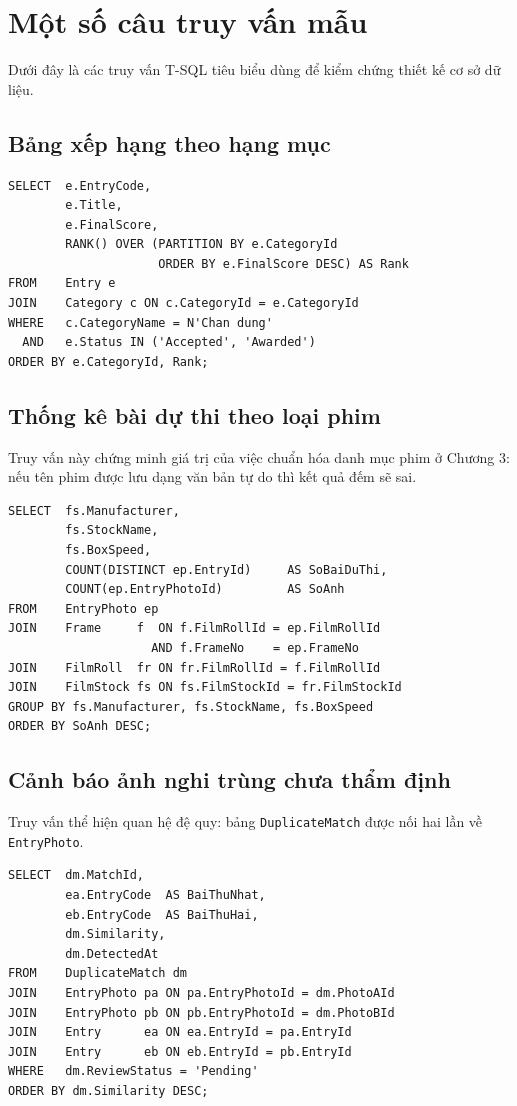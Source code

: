 \section{Một số câu truy vấn mẫu}

Dưới đây là các truy vấn T-SQL tiêu biểu dùng để kiểm chứng thiết kế cơ sở dữ liệu.

\subsection{Bảng xếp hạng theo hạng mục}

\begin{lstlisting}[style=sqlstyle]
SELECT  e.EntryCode,
        e.Title,
        e.FinalScore,
        RANK() OVER (PARTITION BY e.CategoryId
                     ORDER BY e.FinalScore DESC) AS Rank
FROM    Entry e
JOIN    Category c ON c.CategoryId = e.CategoryId
WHERE   c.CategoryName = N'Chan dung'
  AND   e.Status IN ('Accepted', 'Awarded')
ORDER BY e.CategoryId, Rank;
\end{lstlisting}

\subsection{Thống kê bài dự thi theo loại phim}

Truy vấn này chứng minh giá trị của việc chuẩn hóa danh mục phim ở Chương 3: nếu tên phim được lưu dạng văn bản tự do thì kết quả đếm sẽ sai.

\begin{lstlisting}[style=sqlstyle]
SELECT  fs.Manufacturer,
        fs.StockName,
        fs.BoxSpeed,
        COUNT(DISTINCT ep.EntryId)     AS SoBaiDuThi,
        COUNT(ep.EntryPhotoId)         AS SoAnh
FROM    EntryPhoto ep
JOIN    Frame     f  ON f.FilmRollId = ep.FilmRollId
                    AND f.FrameNo    = ep.FrameNo
JOIN    FilmRoll  fr ON fr.FilmRollId = f.FilmRollId
JOIN    FilmStock fs ON fs.FilmStockId = fr.FilmStockId
GROUP BY fs.Manufacturer, fs.StockName, fs.BoxSpeed
ORDER BY SoAnh DESC;
\end{lstlisting}

\subsection{Cảnh báo ảnh nghi trùng chưa thẩm định}

Truy vấn thể hiện quan hệ đệ quy: bảng \texttt{DuplicateMatch} được nối hai lần về \texttt{EntryPhoto}.

\begin{lstlisting}[style=sqlstyle]
SELECT  dm.MatchId,
        ea.EntryCode  AS BaiThuNhat,
        eb.EntryCode  AS BaiThuHai,
        dm.Similarity,
        dm.DetectedAt
FROM    DuplicateMatch dm
JOIN    EntryPhoto pa ON pa.EntryPhotoId = dm.PhotoAId
JOIN    EntryPhoto pb ON pb.EntryPhotoId = dm.PhotoBId
JOIN    Entry      ea ON ea.EntryId = pa.EntryId
JOIN    Entry      eb ON eb.EntryId = pb.EntryId
WHERE   dm.ReviewStatus = 'Pending'
ORDER BY dm.Similarity DESC;
\end{lstlisting}

